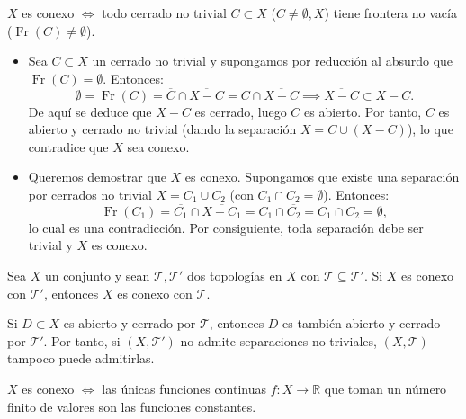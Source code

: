 \begin{ejer}[130]
$X$ es conexo $\iff$ todo cerrado no trivial $C \subset X$ ($C \neq \emptyset, X$) tiene frontera no vacía ($\operatorname{Fr}(C) \neq \emptyset$).
\end{ejer}

\begin{dem}
\begin{itemize}
    \item[$(\Rightarrow)$] Sea $C \subset X$ un cerrado no trivial y supongamos por reducción al absurdo que $\operatorname{Fr}(C) = \emptyset$. Entonces:
    \[
        \emptyset = \operatorname{Fr}(C) = \overline{C} \cap \overline{X - C} = C \cap \overline{X - C} \implies \overline{X - C} \subset X - C.
    \]
    De aquí se deduce que $X - C$ es cerrado, luego $C$ es abierto. Por tanto, $C$ es abierto y cerrado no trivial (dando la separación $X = C \cup (X - C)$), lo que contradice que $X$ sea conexo.

    \item[$(\Leftarrow)$] Queremos demostrar que $X$ es conexo. Supongamos que existe una separación por cerrados no trivial $X = C_1 \cup C_2$ (con $C_1 \cap C_2 = \emptyset$). Entonces:
    \[
        \operatorname{Fr}(C_1) = \overline{C_1} \cap \overline{X - C_1} = C_1 \cap \overline{C_2} = C_1 \cap C_2 = \emptyset,
    \]
    lo cual es una contradicción. Por consiguiente, toda separación debe ser trivial y $X$ es conexo.
\end{itemize}
\end{dem}

\begin{ejer}[133]
Sea $X$ un conjunto y sean $\mathcal{T}, \mathcal{T}'$ dos topologías en $X$ con $\mathcal{T} \subseteq \mathcal{T}'$. Si $X$ es conexo con $\mathcal{T}'$, entonces $X$ es conexo con $\mathcal{T}$.
\end{ejer}

\begin{dem}
Si $D \subset X$ es abierto y cerrado por $\mathcal{T}$, entonces $D$ es también abierto y cerrado por $\mathcal{T}'$. Por tanto, si $(X, \mathcal{T}')$ no admite separaciones no triviales, $(X, \mathcal{T})$ tampoco puede admitirlas.
\end{dem}

\begin{ejer}[134]
$X$ es conexo $\iff$ las únicas funciones continuas $f \colon X \to \mathbb{R}$ que toman un número finito de valores son las funciones constantes.
\end{ejer}

